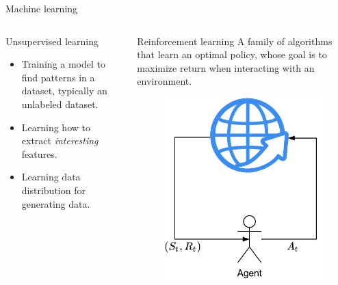 \begin{frame}{Machine learning}
	\begin{columns}
		\begin{column}{.5\textwidth}
			\begin{block}{Unsupervised learning}
				\begin{itemize}
					\item Training a model to find patterns in a dataset, typically an unlabeled dataset.
					\item Learning how to extract {\em interesting} features.
					\item Learning data distribution for generating data.
				\end{itemize}
			\end{block}
		\end{column}
		\begin{column}{.5\textwidth}
			\begin{block}{Reinforcement learning}
				A family of algorithms that learn an optimal policy, whose goal is to maximize return when interacting with an environment. 
				\begin{figure}
					\includegraphics[width=.4\textwidth, center]{figures/RL_1}
				\end{figure}
			\end{block}
		\end{column}
	\end{columns}
\end{frame}